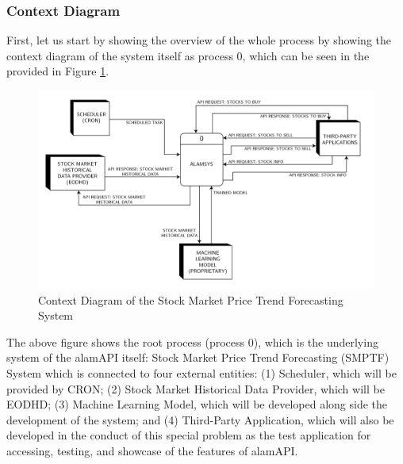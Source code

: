 \subsubsection{Context Diagram}
\label{subsubsec:context_dfd}
First, let us start by showing the overview of 
the whole process by showing the context diagram of the system itself as 
process 0, which can be seen in the provided in Figure \ref{fig:context_dfd}.
\begin{figure}[ht]
    \centering
    \includegraphics[width=1\textwidth]{./assets/Data Flow Diagram-01.png}
    \caption{Context Diagram of the Stock Market Price Trend Forecasting System}
    \label{fig:context_dfd}
\end{figure}
\FloatBarrier
\vspace{0.5cm}
The above figure shows the root process (process 0), which is the underlying 
system of the alamAPI itself: Stock Market Price Trend Forecasting (SMPTF) 
System which is connected to four external entities: (1) Scheduler, 
which will be provided by CRON; (2) Stock Market Historical Data Provider, 
which will be EODHD; (3) Machine Learning Model, which will be developed 
along side the development of the system; and (4) Third-Party Application, 
which will also be developed in the conduct of this special problem as the 
test application for accessing, testing, and showcase of the features of alamAPI.
\hfill \\


